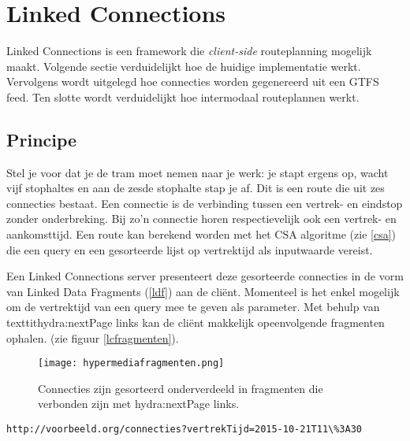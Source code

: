 \chapter{Linked Connections}
\label{lc}

Linked Connections \cite{colpaert_iswc_2015} is een framework die \textit{client-side} routeplanning mogelijk maakt. Volgende sectie verduidelijkt hoe de huidige implementatie werkt. Vervolgens wordt uitgelegd hoe connecties worden gegenereerd uit een GTFS feed. Ten slotte wordt verduidelijkt hoe intermodaal routeplannen werkt.

\section{Principe}

Stel je voor dat je de tram moet nemen naar je werk: je stapt ergens op, wacht vijf stophaltes en aan de zesde stophalte stap je af. Dit is een route die uit zes connecties bestaat. Een connectie is de verbinding tussen een vertrek- en eindstop zonder onderbreking. Bij zo'n connectie horen respectievelijk ook een vertrek- en aankomsttijd. Een route kan berekend worden met het CSA algoritme (zie \ref{csa}) die een query en een gesorteerde lijst op vertrektijd als inputwaarde vereist.

Een Linked Connections server presenteert deze gesorteerde connecties in de vorm van Linked Data Fragments (\ref{ldf}) aan de cli\"ent. Momenteel is het enkel mogelijk om de vertrektijd van een query mee te geven als parameter. Met behulp van texttit{hydra:nextPage} links kan de cli\"ent makkelijk opeenvolgende fragmenten ophalen. (zie figuur \ref{lcfragmenten}).

\begin{figure}[h!]
\centering
\texttt{[image: hypermediafragmenten.png]}
\caption{Connecties zijn gesorteerd onderverdeeld in fragmenten die verbonden zijn met hydra:nextPage links.}
\label{lcfragm}
\end{figure}

\begin{lstlisting}[label=queryconnecties,caption=HTTP URL van fragment met Linked Connections.]
http://voorbeeld.org/connecties?vertrekTijd=2015-10-21T11\%3A30
\end{lstlisting}

